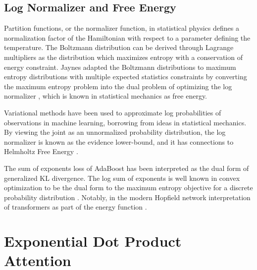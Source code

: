 \documentclass{article}
\begin{document}
\subsection{Log Normalizer and Free Energy}
\label{log normalizer}

Partition functions, or the normalizer function, in statistical physics defines a normalization factor of the Hamiltonian with respect to a parameter defining the temperature. The Boltzmann distribution can be derived through Lagrange multipliers as the distribution which maximizes entropy with a conservation of energy constraint. Jaynes adapted the Boltzmann distributions to maximum entropy distributions with multiple expected statistics constraints by converting the maximum entropy problem into the dual problem of optimizing the log normalizer \cite{1456693}, which is known in statistical mechanics as free energy.

Variational methods have been used to approximate log probabilities of observations in machine learning, borrowing from ideas in statistical mechanics. By viewing the joint as an unnormalized probability distribution, the log normalizer is known as the evidence lower-bound, and it has connections to Helmholtz Free Energy \cite{Hinton:1995,koller2009probabilistic}.

The sum of exponents loss of AdaBoost \cite{collins00logistic} has been interpreted as the dual form of generalized KL divergence. The log sum of exponents is well known in convex optimization to be the dual form to the maximum entropy objective for a discrete probability distribution \cite{citeulike:163662}. Notably, in the modern Hopfield network interpretation of transformers as part of the energy function \cite{DBLP:journals/corr/abs-2008-02217}.

\section{Exponential Dot Product Attention}
\label{exponential dot product attention}
\end{document}
